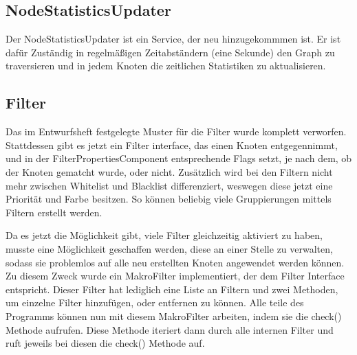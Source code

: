 \subsection{NodeStatisticsUpdater}

Der NodeStatisticsUpdater ist ein Service, der neu hinzugekommmen ist. Er ist dafür Zuständig in regelmäßigen Zeitabständern (eine Sekunde) den Graph zu traversieren und
in jedem Knoten die zeitlichen Statistiken zu aktualisieren.

\subsection{Filter}

Das im Entwurfsheft festgelegte Muster für die Filter wurde komplett verworfen. Stattdessen gibt es jetzt ein Filter interface, das einen Knoten entgegennimmt, und in der
FilterPropertiesComponent entsprechende Flags setzt, je nach dem, ob der Knoten gematcht wurde, oder nicht. Zusätzlich wird bei den Filtern nicht mehr zwischen Whitelist und
Blacklist differenziert, weswegen diese jetzt eine Priorität und Farbe besitzen. So können beliebig viele Gruppierungen mittels Filtern erstellt werden. \par
Da es jetzt die Möglichkeit gibt, viele Filter gleichzeitig aktiviert zu haben, musste eine Möglichkeit geschaffen werden, diese an einer Stelle zu verwalten, sodass sie problemlos
auf alle neu erstellten Knoten angewendet werden können. Zu diesem Zweck wurde ein MakroFilter implementiert, der dem Filter Interface entspricht. Dieser Filter hat lediglich eine
Liste an Filtern und zwei Methoden, um einzelne Filter hinzufügen, oder entfernen zu können. Alle teile des Programms können nun mit diesem MakroFilter arbeiten, indem sie die check()
Methode aufrufen. Diese Methode iteriert dann durch alle internen Filter und ruft jeweils bei diesen die check() Methode auf. 